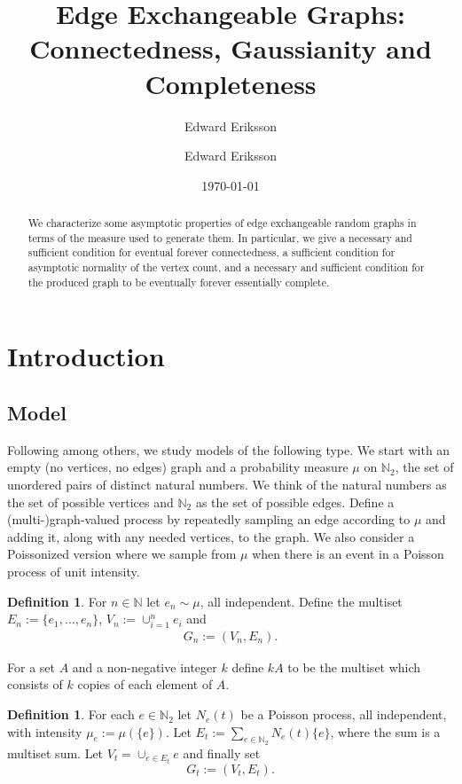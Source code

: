 \documentclass[12pt]{article}
\date{\today}
\author{Edward Eriksson}
\title{Edge Exchangeable Graphs:\\ Connectedness, Gaussianity and Completeness}
\author[1]{Edward Eriksson}
\affil[1]{Max Planck Institute for Mathematics in the Sciences, Leipzig}
\date{}
\theoremstyle{definition}
\newtheorem{definition}[proposition]{Definition}
\begin{document}
\maketitle
\begin{abstract}
We characterize some asymptotic properties of edge exchangeable random graphs in terms of the measure used to generate them. In particular, we give a necessary and sufficient condition for eventual forever connectedness, a sufficient condition for asymptotic normality of the vertex count, and a necessary and sufficient condition for the produced graph to be eventually forever essentially complete. 
\end{abstract}
\section{Introduction} \label{Introduction}
\subsection{Model}

Following \cite{janson_2017_on,crane_2018_edge,cai_2016_edgeexchangeable,luo_2023_anomalous,li_2021_truncated} among others, we study models of the following type. We start with an empty (no vertices, no edges) graph and a probability measure $\mu$ on $\mathbb{N}_2$, the set of unordered pairs of distinct natural numbers. We think of the natural numbers as the set of possible vertices and $\mathbb{N}_2$ as the set of possible edges. Define a (multi-)graph-valued process by repeatedly sampling an edge according to $\mu$ and adding it, along with any needed vertices, to the graph. We also consider a Poissonized version where we sample from $\mu$ when there is an event in a Poisson process of unit intensity.

\begin{definition}
For $n \in \mathbb{N}$ let $e_n \sim \mu$, all independent. Define the multiset $E_n := \{e_1,\ldots,e_n\}$, $V_n := \cup_{i=1}^ne_i$ and
\begin{align*}
    G_n := (V_n,E_n).
\end{align*}
\end{definition}
For a set $A$ and a non-negative integer $k$ define $kA$ to be the multiset which consists of $k$ copies of each element of $A$.
\begin{definition}
For each $e \in \mathbb{N}_2$ let $N_e(t)$ be a Poisson process, all independent, with intensity $\mu_e := \mu(\{e\})$.  Let $E_t := \sum_{e \in \mathbb{N}_2}N_{e}(t)\{e\}$, where the sum is a multiset sum. Let  $V_t = \cup_{e \in E_t}e$ and finally set
$$G_t := (V_t,E_t).$$
\end{definition}
\end{document}
